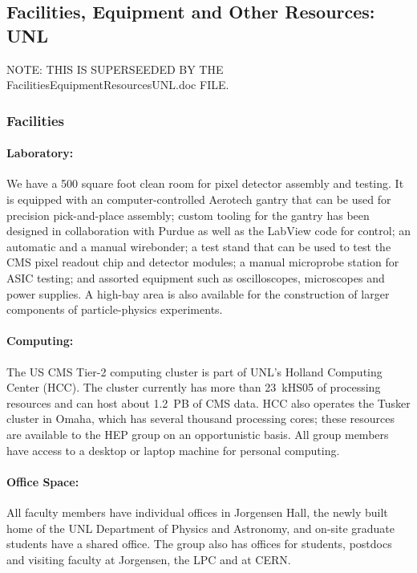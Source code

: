 \subsection{Facilities, Equipment and Other Resources: UNL}

NOTE: THIS IS SUPERSEEDED BY THE FacilitiesEquipmentResourcesUNL.doc FILE.



\subsubsection{Facilities}
\paragraph{Laboratory:} We have a 500 square foot clean room for pixel detector
assembly and testing.  It is equipped with an computer-controlled
Aerotech gantry that can be used for precision pick-and-place
assembly; custom tooling for the gantry has been designed in
collaboration with Purdue as well as the LabView code for control; an
automatic and a manual wirebonder; a test stand that can be used to
test the CMS pixel readout chip and detector modules; a manual
microprobe station for ASIC testing; and assorted equipment such as
oscilloscopes, microscopes and power supplies.  A high-bay area is
also available for the construction of larger components of
particle-physics experiments.

\paragraph{Computing:} The US CMS Tier-2 computing cluster is part of UNL's
Holland Computing Center (HCC).  The cluster currently has more than
23~kHS05 of processing resources and can host about 1.2~PB of CMS data.
HCC also operates the Tusker cluster in Omaha, which has several thousand
processing cores; these resources are available to the HEP group on an
opportunistic basis.  All group members have access to a desktop or laptop
machine for personal computing.

\paragraph{Office Space:} All faculty members have individual offices in Jorgensen
Hall, the newly built home of the UNL Department of Physics and Astronomy, and on-site
graduate students have a shared office.  The group also has offices for
students, postdocs and visiting faculty at Jorgensen, the LPC and at
CERN.

